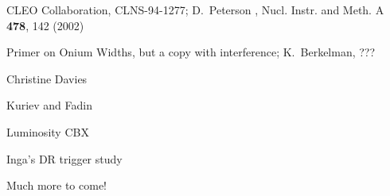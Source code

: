 \documentclass[aps,prd,preprint,superscriptaddress,tightenlines,nofootinbib,floatfix]{revtex4}
\begin{document}
%
%
\def\endpoint{;~~}
\def\Journal#1&#2&#3(#4){#1{\bf #2}, #3 (#4)}
\def\NIM{Nucl. Instr. and Meth. }
\def\NIMA{Nucl. Instr. and Meth. A }
\def\NPB{Nucl. Phys. B }
\def\PLB{Phys. Lett. B }
\def\PRL{Phys. Rev. Lett. }
\def\PRD{Phys. Rev. D }
\newpage
\begin{thebibliography}{99}

 CLEO Collaboration, CLNS-94-1277; D.\ Peterson \etal, {\Journal\NIMA&478&142(2002)}

 Primer on Onium Widths, but a copy with interference; K.\ Berkelman, ???

 Christine Davies

 Kuriev and Fadin

 Luminosity CBX

 Inga's DR trigger study

 Much more to come!

\end{thebibliography}
\end{document}
